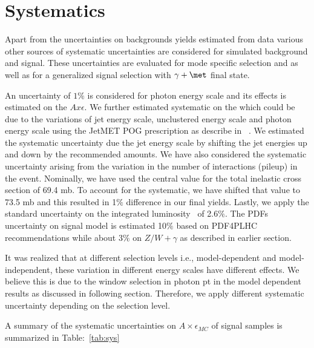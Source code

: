 \section{Systematics}
\label{sec:systematics}


  Apart from the uncertainties on backgrounds yields estimated from data various other sources of systematic uncertainties are considered for simulated background and signal. These uncertainties are evaluated for mode specific selection and as well as for a generalized signal selection with $\gamma+\met$ final state.

  An uncertainty of $1\%$ is considered for photon energy scale and its effects is estimated on the $A x \epsilon$.  We further estimated systematic on the \met which could be due to the variations of jet energy scale, unclustered energy scale and photon energy scale using the JetMET POG prescription as describe in ~\cite{met}. We estimated the systematic uncertainty due the jet energy scale by shifting the jet energies up and down by the recommended amounts. We have also considered  the systematic uncertainty arising from the variation in the number of interactions (pileup) in the event. Nominally, we have used the central value for the total inelastic cross section of 69.4 mb. To account for the systematic, we have shifted that value to 73.5 mb and this resulted in 1$\%$ difference in our final yields. Lastly, we apply the standard uncertainty on the integrated luminosity~\cite{LUM-13-001} of 2.6$\%$. The PDFs uncertainty on signal model is estimated 10$\%$ based on PDF4PLHC recommendations while about $3\%$ on $Z/W+\gamma$ as described in earlier section.

  It was realized that at different selection levels i.e., model-dependent and model-independent, these variation in different energy scales have different effects. We believe this is due to the window selection in photon pt in the model dependent results as discussed in following section. Therefore, we  apply different systematic uncertainty depending on the selection level.

A summary of the systematic uncertainties on $A\times \epsilon_{MC}$ of signal samples is summarized in Table:~\ref{tab:sys}

